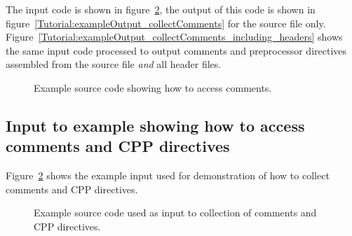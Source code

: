The input code is shown in figure~\ref{Tutorial:exampleInputCode_collectComments},
the output of this code is shown in 
figure~\ref{Tutorial:exampleOutput_collectComments} for the source file only.
Figure~\ref{Tutorial:exampleOutput_collectComments_including_headers} shows the
same input code processed to output comments and preprocessor directives assembled from 
the source file {\em and} all header files.

\begin{figure}[!h]
{\indent
{\mySmallFontSize

\begin{latexonly}
   
\end{latexonly}

\begin{htmlonly}
   
\end{htmlonly}

}
}
\caption{Example source code showing how to access comments. }
\label{Tutorial:example_collectComments}
\end{figure}



\subsection{Input to example showing how to access comments and CPP directives}

   Figure~\ref{Tutorial:exampleInputCode_collectComments}
shows the example input used for demonstration of how to collect comments and CPP directives.

\begin{figure}[!h]
{\indent
{\mySmallFontSize

\begin{latexonly}
   
\end{latexonly}

\begin{htmlonly}
   
\end{htmlonly}

}
}
\caption{Example source code used as input to collection of comments and CPP directives.}
\label{Tutorial:exampleInputCode_collectComments}
\end{figure}



